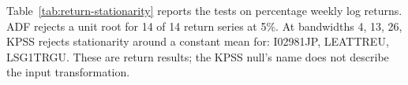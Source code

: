 Table~\ref{tab:return-stationarity} reports the tests on percentage weekly log returns. ADF rejects a unit root for 14 of 14 return series at 5\%. At bandwidths 4, 13, 26, KPSS rejects stationarity around a constant mean for: I02981JP, LEATTREU, LSG1TRGU. These are return results; the KPSS null's name does not describe the input transformation.
